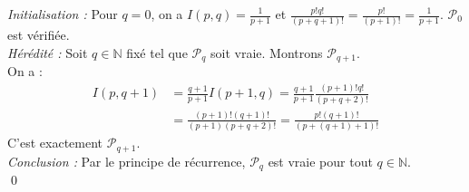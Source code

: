 \documentclass[10pt]{article}
\begin{document}
\begin{tcolorbox}[enhanced, width=7in, center, size=fbox, fontupper=\large, drop shadow southwest]
    \emph{Initialisation :} Pour $q=0$, on a $I(p,q)=\frac{1}{p+1}$ et $\frac{p!q!}{(p+q+1)!}=\frac{p!}{(p+1)!}=\frac{1}{p+1}$. $\mathcal{P}_0$ est vérifiée.\\
    \emph{Hérédité :} Soit $q\in\mathbb{N}$ fixé tel que $\mathcal{P}_q$ soit vraie. Montrons $\mathcal{P}_{q+1}$.\\
    On a :
    \begin{align*}
        I(p,q+1)&=\frac{q+1}{p+1}I(p+1,q)=\frac{q+1}{p+1}\frac{(p+1)!q!}{(p+q+2)!}\\
        &=\frac{(p+1)!(q+1)!}{(p+1)(p+q+2)!}=\frac{p!(q+1)!}{(p+(q+1)+1)!}
    \end{align*}
    C'est exactement $\mathcal{P}_{q+1}$.\\
    \emph{Conclusion :} Par le principe de récurrence, $\mathcal{P}_q$ est vraie pour tout $q\in\mathbb{N}$.\\
    \qed
\end{tcolorbox}

\end{document}
